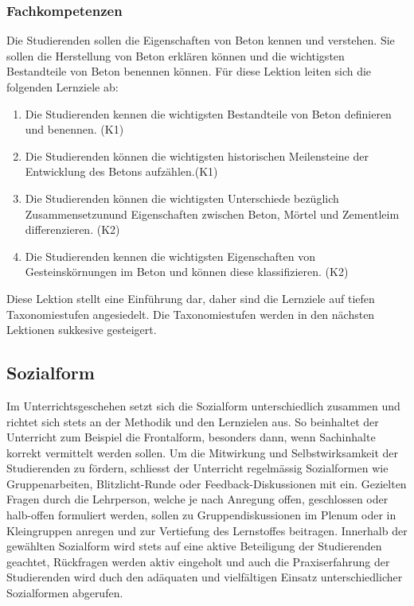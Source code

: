\documentclass[
11pt,
captions=tableheading,
smallheadings,
headsepline,
footsepline, 
captions=tableheading,
parskip=half-,
]{scrartcl}
\begin{document}
\subsubsection{Fachkompetenzen}
Die Studierenden sollen die Eigenschaften von Beton kennen und verstehen.
Sie sollen die Herstellung von Beton erklären können und die wichtigsten Bestandteile von Beton benennen können.
Für diese Lektion leiten sich die folgenden Lernziele ab:
\begin{enumerate}
    \item Die Studierenden kennen die wichtigsten Bestandteile von Beton definieren und benennen. (K1)
    \item Die Studierenden können die wichtigsten historischen Meilensteine der Entwicklung des Betons aufzählen.(K1)
    \item Die Studierenden können die wichtigsten Unterschiede bezüglich Zusammensetzunund  Eigenschaften zwischen Beton, Mörtel und Zementleim differenzieren.
    (K2)
    \item Die Studierenden kennen die wichtigsten Eigenschaften von Gesteinskörnungen im Beton und können diese klassifizieren. (K2)
\end{enumerate}

Diese Lektion stellt eine Einführung dar, daher sind die Lernziele auf tiefen Taxonomiestufen angesiedelt.
Die Taxonomiestufen werden in den nächsten Lektionen sukkesive gesteigert.



\subsection{Sozialform}
Im Unterrichtsgeschehen setzt sich die Sozialform unterschiedlich zusammen und richtet sich stets an der Methodik und den Lernzielen aus. So beinhaltet der Unterricht zum Beispiel die Frontalform, besonders dann, wenn Sachinhalte korrekt vermittelt werden sollen. Um die Mitwirkung und Selbstwirksamkeit der Studierenden zu fördern, schliesst der Unterricht regelmässig Sozialformen wie Gruppenarbeiten, Blitzlicht-Runde oder Feedback-Diskussionen mit ein.  Gezielten Fragen durch die Lehrperson, welche je nach Anregung offen, geschlossen oder halb-offen formuliert werden, sollen zu Gruppendiskussionen im Plenum oder in Kleingruppen anregen und zur Vertiefung des Lernstoffes beitragen. Innerhalb der gewählten Sozialform wird stets auf eine aktive Beteiligung der Studierenden geachtet, Rückfragen werden aktiv eingeholt und auch die Praxiserfahrung der Studierenden wird duch den adäquaten und vielfältigen Einsatz unterschiedlicher Sozialformen abgerufen.
\end{document}
